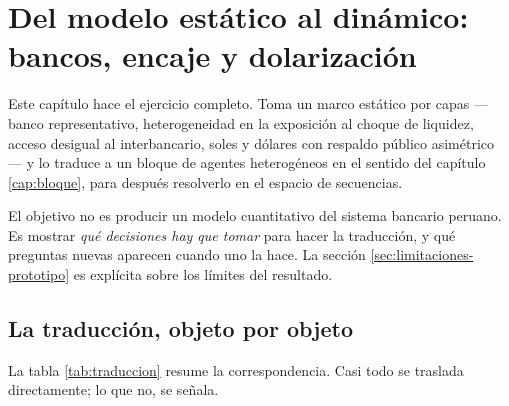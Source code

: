 \chapter{Del modelo estático al dinámico: bancos, encaje y dolarización}
\label{cap:aplicacion}

Este capítulo hace el ejercicio completo. Toma un marco estático por capas
--- banco representativo, heterogeneidad en la exposición al choque de liquidez,
acceso desigual al interbancario, soles y dólares con respaldo público asimétrico
--- y lo traduce a un bloque de agentes heterogéneos en el sentido del capítulo
\ref{cap:bloque}, para después resolverlo en el espacio de secuencias.

El objetivo no es producir un modelo cuantitativo del sistema bancario peruano.
Es mostrar \emph{qué decisiones hay que tomar} para hacer la traducción, y qué
preguntas nuevas aparecen cuando uno la hace. La sección
\ref{sec:limitaciones-prototipo} es explícita sobre los límites del resultado.

\section{La traducción, objeto por objeto}

La tabla \ref{tab:traduccion} resume la correspondencia. Casi todo se traslada
directamente; lo que no, se señala.

